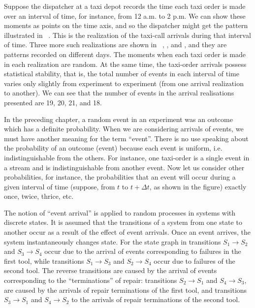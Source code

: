  Suppose the dispatcher at a taxi depot records the time each taxi
 order is made over an interval of time, for instance, from 12 a.m. to
 2 p.m. We can show these moments as points on the time axis, and so
 the dispatcher might get the pattern illustrated in 
 ~. This is the realization of the taxi-call arrivals  during that interval of time. Three more such realizations are shown
 in ~, , and , and they are patterns recorded on different days. The moments when each taxi order is made
 in each realization are random. At the same time, the taxi-order arrivals possess statistical stability, that is, the total number of events in each interval of time varies only slightly from experiment to experiment
(from one arrival realization to another). We can see that the number of
events in the arrival realisations presented are 19, 20, 21, and 18.

In the preceding chapter, a random event in an experiment was an
outcome which has a definite probability. When we are considering
arrivals of events, we must have another meaning for the term
``event''.  There is no use speaking about the probability of an
outcome (event) because each event is uniform, i.e. indistinguishable
from the others. For instance, one taxi-order is a single event in a
stream and is indistinguishable from another event. Now let us
consider other probabilities, for instance, the probabilities that an
event will occur during a given interval of time (suppose, from $t$ to
$t + \Delta t$, as shown in the ﬁgure) exactly once, twice, thrice,
etc.

The notion of ``event arrival'' is applied to random processes in
systems with discrete states. It is assumed that the transitions of a
system from one state to another occur as a result of the effect of
event arrivals. Once an event arrives, the system instantaneously
changes state. For the state graph in  transitions
$S_{1} \to S_{2}$ and $S_{3} \to S_{4}$ occur due to the arrival of
events corresponding to failures in the ﬁrst tool, while transitions
$S_{1} \to S_{3}$ and $S_{2} \to S_{4}$ occur due to failures of the
second tool. The reverse transitions are caused by the arrival of
events corresponding to the ``terminations'' of repair: transitions
$S_{2} \to S_{1}$ and $S_{4} \to S_{3}$, are caused by the arrivals of
repair terminations of the ﬁrst tool, and transitions
$S_{3} \to S_{1}$ and $S_{4} \to S_{2}$ to the arrivals of repair
terminations of the second tool.

